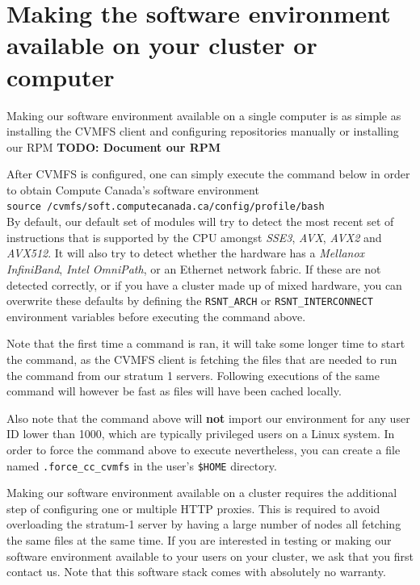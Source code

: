 \documentclass[sigconf]{acmart}
\begin{document}
\section{Making the software environment available on your cluster or computer}
\label{sec:Making_it_available}
Making our software environment available on a single computer is as simple as installing the CVMFS client and configuring repositories manually or installing our RPM
\textbf{TODO: Document our RPM}

After CVMFS is configured, one can simply execute the command below in order to obtain Compute Canada's software environment \\
\texttt{source /cvmfs/soft.computecanada.ca/config/profile/bash} \\

By default, our default set of modules will try to detect the most recent set of instructions that is supported by the CPU amongst {\it SSE3}, {\it AVX}, {\it AVX2} and {\it AVX512}. It will also try to detect whether the hardware has a {\it Mellanox InfiniBand}, {\it Intel OmniPath}, or an Ethernet network fabric. If these are not detected correctly, or if you have a cluster made up of mixed hardware, you can overwrite these defaults by defining the {\verb!RSNT_ARCH!} or {\verb!RSNT_INTERCONNECT!} environment variables before executing the command above. 

Note that the first time a command is ran, it will take some longer time to start the command, as the CVMFS client is fetching the files that are needed to run the command from our stratum 1 servers. Following executions of the same command will however be fast as files will have been cached locally. 

Also note that the command above will \textbf{not} import our environment for any user ID lower than 1000, which are typically privileged users on a Linux system. In order to force the command above to execute nevertheless, you can create a file named \verb!.force_cc_cvmfs! in the user's \verb!$HOME! directory. 

Making our software environment available on a cluster requires the additional step of configuring one or multiple HTTP proxies. This is required to avoid overloading the stratum-1 server by having a large number of nodes all fetching the same files at the same time. If you are interested in testing or making our software environment available to your users on your cluster, we ask that you first contact us. Note that this software stack comes with absolutely no warranty. 
\end{document}
